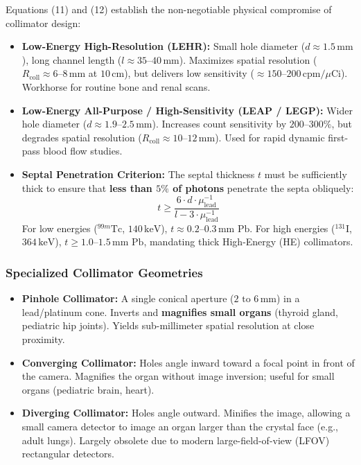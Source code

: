 \documentclass[11pt,a4paper]{article}
\begin{document}
\begin{physicsbox}
Equations (11) and (12) establish the non-negotiable physical compromise of collimator design:
\begin{itemize}[leftmargin=*]
    \item \textbf{Low-Energy High-Resolution (LEHR):} Small hole diameter ($d \approx 1.5\,\text{mm}$), long channel length ($l \approx 35\text{--}40\,\text{mm}$). Maximizes spatial resolution ($R_{\text{coll}} \approx 6\text{--}8\,\text{mm}$ at $10\,\text{cm}$), but delivers low sensitivity ($\approx 150\text{--}200\,\text{cpm/}\mu\text{Ci}$). Workhorse for routine bone and renal scans.
    \item \textbf{Low-Energy All-Purpose / High-Sensitivity (LEAP / LEGP):} Wider hole diameter ($d \approx 1.9\text{--}2.5\,\text{mm}$). Increases count sensitivity by $200\text{--}300\%$, but degrades spatial resolution ($R_{\text{coll}} \approx 10\text{--}12\,\text{mm}$). Used for rapid dynamic first-pass blood flow studies.
    \item \textbf{Septal Penetration Criterion:} The septal thickness $t$ must be sufficiently thick to ensure that \textbf{less than $5\%$ of photons} penetrate the septa obliquely:
    \begin{equation}
        t \ge \frac{6 \cdot d \cdot \mu_{\text{lead}}^{-1}}{l - 3 \cdot \mu_{\text{lead}}^{-1}}
    \end{equation}
    For low energies ($^{99m}\text{Tc}$, $140\,\text{keV}$), $t \approx 0.2\text{--}0.3\,\text{mm Pb}$. For high energies ($^{131}\text{I}$, $364\,\text{keV}$), $t \ge 1.0\text{--}1.5\,\text{mm Pb}$, mandating thick High-Energy (HE) collimators.
\end{itemize}
\end{physicsbox}

\subsubsection{Specialized Collimator Geometries}
\begin{itemize}[leftmargin=*]
    \item \textbf{Pinhole Collimator:} A single conical aperture ($2\text{ to }6\,\text{mm}$) in a lead/platinum cone. Inverts and \textbf{magnifies small organs} (thyroid gland, pediatric hip joints). Yields sub-millimeter spatial resolution at close proximity.
    \item \textbf{Converging Collimator:} Holes angle inward toward a focal point in front of the camera. Magnifies the organ without image inversion; useful for small organs (pediatric brain, heart).
    \item \textbf{Diverging Collimator:} Holes angle outward. Minifies the image, allowing a small camera detector to image an organ larger than the crystal face (e.g., adult lungs). Largely obsolete due to modern large-field-of-view (LFOV) rectangular detectors.
\end{itemize}
\end{document}
